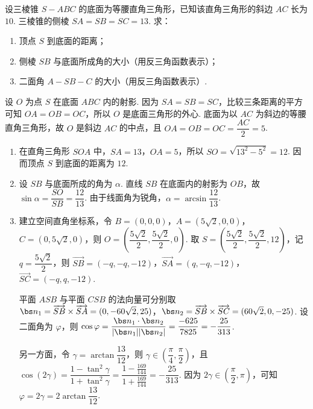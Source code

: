 \documentclass[UTF8,a4paper,oneside,11pt]{ctexbook}
\begin{document}
\begin{problem}
设三棱锥 \(S-ABC\) 的底面为等腰直角三角形，已知该直角三角形的斜边 \(AC\) 长为 \(10\). 三棱锥的侧棱 \(SA=SB=SC=13\). 求：

\begin{enumerate}
\item 顶点 \(S\) 到底面的距离；
\item 侧棱 \(SB\) 与底面所成角的大小（用反三角函数表示）；
\item 二面角 \(A-SB-C\) 的大小（用反三角函数表示）.
\end{enumerate}

\end{problem}

\begin{solution}
设 \(O\) 为点 \(S\) 在底面 \(ABC\) 内的射影. 因为 \(SA=SB=SC\)，比较三条距离的平方可知 \(OA=OB=OC\)，所以 \(O\) 是底面三角形的外心. 底面为以 \(AC\) 为斜边的等腰直角三角形，故 \(O\) 是斜边 \(AC\) 的中点，且
\(OA=OB=OC=\dfrac{AC}{2}=5\).

\begin{enumerate}
\item 在直角三角形 \(SOA\) 中，\(SA=13\)，\(OA=5\)，所以 \(SO=\sqrt{13^2-5^2}=12\). 因而顶点 \(S\) 到底面的距离为 \(12\).
\item 设 \(SB\) 与底面所成的角为 \(\alpha\). 直线 \(SB\) 在底面内的射影为 \(OB\)，故 \(\sin\alpha=\dfrac{SO}{SB}=\dfrac{12}{13}\). 由于线面角为锐角，\(\alpha=\arcsin\dfrac{12}{13}\).
\item 建立空间直角坐标系，令 \(B=(0,0,0)\)，\(A=(5\sqrt2,0,0)\)，\(C=(0,5\sqrt2,0)\)，则 \(O=\left(\dfrac{5\sqrt2}{2},\dfrac{5\sqrt2}{2},0\right)\). 取 \(S=\left(\dfrac{5\sqrt2}{2},\dfrac{5\sqrt2}{2},12\right)\)，记 \(q=\dfrac{5\sqrt2}{2}\)，则
\(\overrightarrow{SB}=(-q,-q,-12)\)，\(\overrightarrow{SA}=(q,-q,-12)\)，\(\overrightarrow{SC}=(-q,q,-12)\).

平面 \(ASB\) 与平面 \(CSB\) 的法向量可分别取
\(\bs n_1=\overrightarrow{SB}\times\overrightarrow{SA}=(0,-60\sqrt2,25)\)，\(\bs n_2=\overrightarrow{SB}\times\overrightarrow{SC}=(60\sqrt2,0,-25)\). 设二面角为 \(\varphi\)，则
\(\cos\varphi=\dfrac{\bs n_1\cdot\bs n_2}{|\bs n_1||\bs n_2|}=\dfrac{-625}{7825}=-\dfrac{25}{313}\).

另一方面，令 \(\gamma=\arctan\dfrac{13}{12}\)，则 \(\gamma\in\left(\dfrac\pi4,\dfrac\pi2\right)\)，且
\(\cos(2\gamma)=\dfrac{1-\tan^2\gamma}{1+\tan^2\gamma}=\dfrac{1-\frac{169}{144}}{1+\frac{169}{144}}=-\dfrac{25}{313}\). 因为 \(2\gamma\in\left(\dfrac\pi2,\pi\right)\)，可知 \(\varphi=2\gamma=2\arctan\dfrac{13}{12}\).
\end{enumerate}
\end{solution}
\end{document}
